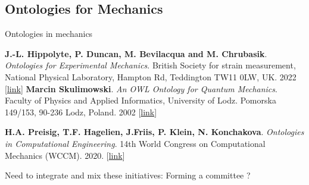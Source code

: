 \documentclass[10pt,compress,serif,aspectratio=169]{beamer}
\begin{document}

\subsection{Ontologies for Mechanics}
\begin{frame}[t]{Ontologies in mechanics}

\textbf{J.-L. Hippolyte, P. Duncan, M. Bevilacqua and M. Chrubasik}. \textit{Ontologies for Experimental Mechanics}. British Society for strain measurement, National Physical Laboratory, Hampton Rd, Teddington TW11 0LW, UK. 2022 [\href{https://www.bssm.org/media/smjj4h43/ontologies-for-experimental-mechanics.pdf}{link}]
\vfill
\textbf{Marcin Skulimowski}. \textit{An OWL Ontology for Quantum Mechanics}. Faculty of Physics and Applied Informatics, University of Lodz. Pomorska 149/153, 90-236 Lodz, Poland. 2002 [\href{https://ceur-ws.org/Vol-614/owled2010_submission_18.pdf}{link}]
\vfill

\textbf{H.A. Preisig, T.F. Hagelien, J.Friis, P. Klein, N. Konchakova}. \textit{Ontologies in Computational Engineering}. 14th World Congress on Computational Mechanics (WCCM). 2020. [\href{https://www.scipedia.com/wd/images/d/dd/Draft_Content_689054725p3366.pdf}{link}]

\vfill
\pause
\begin{center}
\Large
  \alert{Need to integrate and mix these initiatives: Forming a committee ?}
\end{center}
\end{frame}

\end{document}
